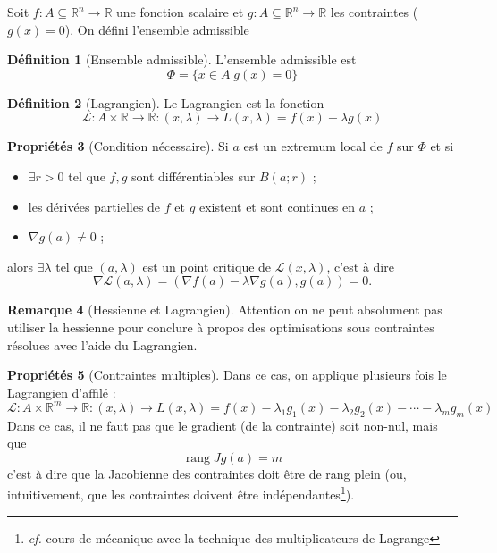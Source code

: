 \documentclass[11pt,a4paper]{article}
\theoremstyle{definition}
\newtheorem{mydef}{Définition}%
\newtheorem{myprop}[mydef]{Propriétés}
\newtheorem{myrem}[mydef]{Remarque}
\DeclareMathOperator{\newrang}{rang}
\newcommand{\R}{\mathbb{R}}
\begin{document}
Soit $f : A \subseteq \R^n \to \R$ une fonction scalaire et $g : A \subseteq \R^n \to \R$ les contraintes ($g(x) = 0$). On défini l'ensemble admissible

\begin{mydef}[Ensemble admissible] L'ensemble admissible est
	\[ \Phi = \{ x \in A | g(x) = 0 \} \]
\end{mydef}

\begin{mydef}[Lagrangien] Le Lagrangien est la fonction
	\[ \mathcal{L} : A \times \R \to \R : (x, \lambda) \to L(x, \lambda) = f(x) - \lambda g(x) \]
\end{mydef}

\begin{myprop}[Condition nécessaire]
	Si $a$ est un extremum local de $f$ sur $\Phi$ et si
	\begin{itemize}
		\item $\exists r >0$ tel que $f, g$ sont différentiables
			sur $B(a;r)$ ;
		\item les dérivées partielles de $f$ et $g$ existent et sont continues en $a$ ;
		\item $\nabla g(a) \neq 0$ ;
	\end{itemize}
	alors $\exists \lambda$ tel que $(a,\lambda)$ est un point critique de $\mathcal{L}(x,\lambda)$, c'est à dire
	\[ \nabla \mathcal{L}(a,\lambda) = (\nabla f(a) - \lambda\nabla g(a), g(a)) = 0 .\]
\end{myprop}

\begin{myrem}[Hessienne et Lagrangien]
	Attention on ne peut absolument pas utiliser la hessienne pour conclure à propos des optimisations sous contraintes résolues avec l'aide du Lagrangien.
\end{myrem}

\begin{myprop}[Contraintes multiples]
	Dans ce cas, on applique plusieurs fois le Lagrangien d'affilé :
	\[ \mathcal{L} : A \times \R^m \to \R : (x, \lambda) \to L(x, \lambda) = f(x) - \lambda_1 g_1(x) - \lambda_2 g_2(x) - \cdots - \lambda_m g_m(x) \]
	Dans ce cas, il ne faut pas que le gradient (de la contrainte) soit non-nul, mais que
	\[ \newrang Jg(a) = m \]
	c'est à dire que la Jacobienne des contraintes doit être de rang plein (ou, intuitivement, que les contraintes doivent être indépendantes\footnote{\emph{cf.} cours de mécanique avec la technique des multiplicateurs de Lagrange}).
\end{myprop}
\end{document}
